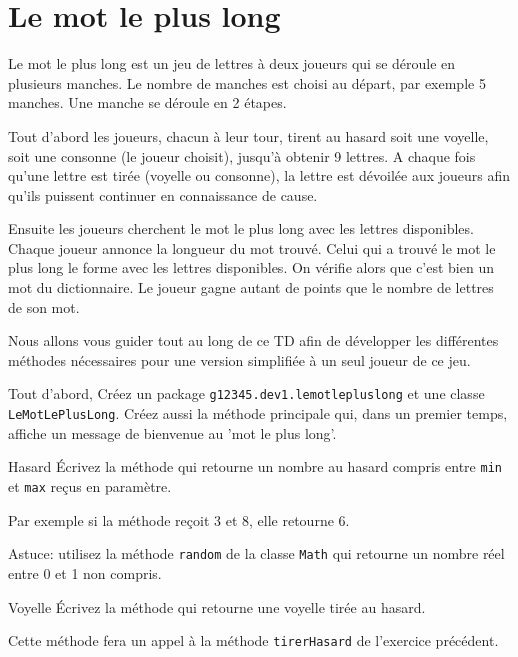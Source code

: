 \documentclass[a4paper,11pt]{style-esi/td}
\begin{document}

\section{Le mot le plus long}

	Le mot le plus long est un jeu de lettres à deux joueurs qui se déroule en
	plusieurs manches. Le nombre de manches est choisi au départ, par exemple 5 manches.
	Une manche se déroule en 2 étapes. 
	
	Tout d'abord les joueurs, chacun à leur tour, 
	tirent au hasard soit une voyelle, soit une consonne (le joueur choisit), 
	jusqu'à obtenir 9 lettres. A chaque fois qu'une lettre est tirée 
	(voyelle ou consonne), la lettre est dévoilée aux joueurs afin qu'ils puissent
	continuer en connaissance de cause.

	Ensuite les joueurs cherchent le mot le plus long avec les lettres disponibles.
	Chaque joueur annonce la longueur du mot trouvé. Celui qui a trouvé le mot le 
	plus long le forme avec les lettres disponibles. On vérifie alors que c'est 
	bien un mot du dictionnaire. Le joueur gagne autant de points que le nombre
	de lettres de son mot. 
			
	Nous allons vous guider tout au long de ce TD 
	afin de développer les différentes méthodes nécessaires 
	pour une version simplifiée à un seul joueur de ce jeu.


	Tout d'abord,
	Créez un package \texttt{g12345.dev1.lemotlepluslong} et une classe
	\texttt{LeMotLePlusLong}. 
	Créez aussi la méthode principale qui, dans un premier temps, 
	affiche un message de bienvenue au 'mot le plus long'.


 	\begin{Exercice}{Hasard}
		\'Ecrivez la méthode  qui
		retourne un nombre au hasard compris entre \texttt{min} et
		\texttt{max} reçus en paramètre.
		
		Par exemple si la méthode reçoit 3 et 8, elle retourne 6.
		
		Astuce: utilisez la méthode \texttt{random} de la classe \texttt{Math} qui 
		retourne un nombre réel entre 0 et 1 non compris.
	\end{Exercice} 

 
 	\begin{Exercice}{Voyelle}
		\'Ecrivez la méthode  qui retourne une voyelle 
		tirée au hasard.
		
		Cette méthode fera un appel à la méthode \texttt{tirerHasard} 
		de l'exercice précédent.
	\end{Exercice} 
\end{document}
